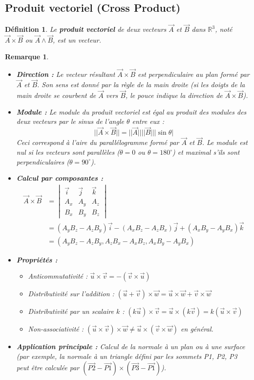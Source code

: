 \documentclass{article}
\newtheorem{definition}{Définition}
\newtheorem{remark}{Remarque}
\begin{document}
\subsection{Produit vectoriel (Cross Product)}
\begin{definition}
Le \textbf{produit vectoriel} de deux vecteurs $\vec{A}$ et $\vec{B}$ dans $\mathbb{R}^3$, noté $\vec{A} \times \vec{B}$ ou $\vec{A} \wedge \vec{B}$, est un vecteur.
\end{definition}
\begin{remark}
\begin{itemize}
    \item \textbf{Direction :} Le vecteur résultant $\vec{A} \times \vec{B}$ est perpendiculaire au plan formé par $\vec{A}$ et $\vec{B}$. Son sens est donné par la règle de la main droite (si les doigts de la main droite se courbent de $\vec{A}$ vers $\vec{B}$, le pouce indique la direction de $\vec{A} \times \vec{B}$).
    \item \textbf{Module :} Le module du produit vectoriel est égal au produit des modules des deux vecteurs par le sinus de l'angle $\theta$ entre eux :
    \[ ||\vec{A} \times \vec{B}|| = ||\vec{A}|| ||\vec{B}|| |\sin \theta| \]
    Ceci correspond à l'aire du parallélogramme formé par $\vec{A}$ et $\vec{B}$. Le module est nul si les vecteurs sont parallèles ($\theta=0$ ou $\theta=180^\circ$) et maximal s'ils sont perpendiculaires ($\theta=90^\circ$).
    \item \textbf{Calcul par composantes :}
    \begin{align*} \vec{A} \times \vec{B} &= \begin{vmatrix} \vec{i} & \vec{j} & \vec{k} \\ A_x & A_y & A_z \\ B_x & B_y & B_z \end{vmatrix} \\ &= (A_y B_z - A_z B_y)\vec{i} - (A_x B_z - A_z B_x)\vec{j} + (A_x B_y - A_y B_x)\vec{k} \\ &= (A_y B_z - A_z B_y, A_z B_x - A_x B_z, A_x B_y - A_y B_x) \end{align*}
    \item \textbf{Propriétés :}
    \begin{itemize}
        \item Anticommutativité : $\vec{u} \times \vec{v} = -(\vec{v} \times \vec{u})$
        \item Distributivité sur l'addition : $(\vec{u} + \vec{v}) \times \vec{w} = \vec{u} \times \vec{w} + \vec{v} \times \vec{w}$
        \item Distributivité par un scalaire $k$ : $(k\vec{u}) \times \vec{v} = \vec{u} \times (k\vec{v}) = k(\vec{u} \times \vec{v})$
        \item Non-associativité : $(\vec{u} \times \vec{v}) \times \vec{w} \neq \vec{u} \times (\vec{v} \times \vec{w})$ en général.
    \end{itemize}
    \item \textbf{Application principale :} Calcul de la normale à un plan ou à une surface (par exemple, la normale à un triangle défini par les sommets P1, P2, P3 peut être calculée par $(\vec{P2}-\vec{P1}) \times (\vec{P3}-\vec{P1})$).
\end{itemize}
\end{remark}
\end{document}
